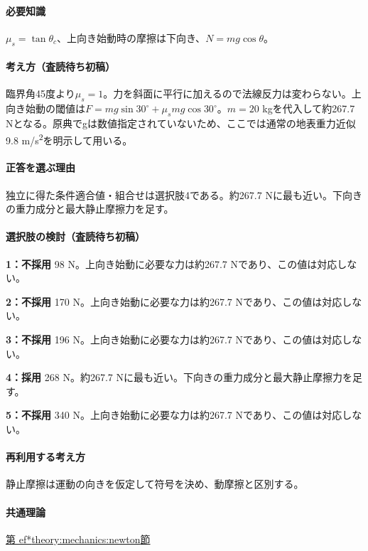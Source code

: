 \paragraph{必要知識} \(\mu_s=\tan\theta_c\)、上向き始動時の摩擦は下向き、\(N=mg\cos\theta\)。

\paragraph{考え方（査読待ち初稿）} 臨界角45度より\(\mu_s=1\)。力を斜面に平行に加えるので法線反力は変わらない。上向き始動の閾値は\(F=mg\sin30^\circ+\mu_smg\cos30^\circ\)。\(m=20\) kgを代入して約267.7 Nとなる。原典でgは数値指定されていないため、ここでは通常の地表重力近似9.8 m/s\textsuperscript{2}を明示して用いる。

\paragraph{正答を選ぶ理由} 独立に得た条件適合値・組合せは選択肢4である。約267.7 Nに最も近い。下向きの重力成分と最大静止摩擦力を足す。

\paragraph{選択肢の検討（査読待ち初稿）}

\noindent\textbf{1：不採用} 98 N。上向き始動に必要な力は約267.7 Nであり、この値は対応しない。\par

\noindent\textbf{2：不採用} 170 N。上向き始動に必要な力は約267.7 Nであり、この値は対応しない。\par

\noindent\textbf{3：不採用} 196 N。上向き始動に必要な力は約267.7 Nであり、この値は対応しない。\par

\noindent\textbf{4：採用} 268 N。約267.7 Nに最も近い。下向きの重力成分と最大静止摩擦力を足す。\par

\noindent\textbf{5：不採用} 340 N。上向き始動に必要な力は約267.7 Nであり、この値は対応しない。\par

\paragraph{再利用する考え方} 静止摩擦は運動の向きを仮定して符号を決め、動摩擦と区別する。

\paragraph{共通理論} \hyperref[theory:mechanics:newton]{第
ef*{theory:mechanics:newton}節}

